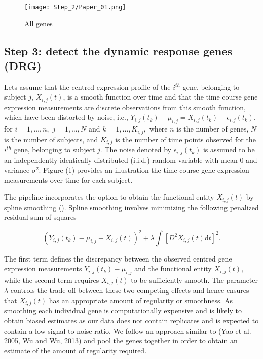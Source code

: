 
\begin{figure}
\centering
\texttt{[image: Step\_2/Paper\_01.png]}
\caption{All genes}
\label{fig:allgenes}
\end{figure}

\subsection*{Step 3: detect the dynamic response genes (DRG)}

Lets assume that the centred expression profile of the $i^{th}$ gene, belonging to subject $j$, $X_{i,j}(t)$, is a smooth function over time and that the time course gene expression measurements are discrete observations from this smooth function, which have been distorted by noise, i.e., $Y_{i,j}(t_{k}) -\mu_{i,j} =X_{i,j}(t_{k})+\epsilon_{i,j}(t_{k})$, for $i=1,\ldots,n,$ $j=1,\ldots,N$ and $k=1,\ldots,K_{i,j},$ where $n$ is the number of genes, $N$ is the number of subjects, and $K_{i,j}$ is the number of time points observed for the $i^{th}$ gene, belonging to subject $j$. The noise denoted by $\epsilon_{i,j}(t_{k})$ is assumed to be an independently identically distributed (i.i.d.) random variable with mean $0$ and variance $\sigma^{2}$. Figure (1) provides an illustration the time course gene expression measurements over time for each subject.

The pipeline incorporates the option to obtain the functional entity $X_{i,j}(t)$ by spline smoothing (\cite{green1993nonparametric,silverman2005functional}). Spline smoothing involves minimizing the following penalized residual sum of squares 

\begin{equation}
\label{eq:res_sum_squares}
(Y_{i,j}(t_{k}) -\mu_{i,j} - X_{i,j}(t))^{2} + \lambda \int \left[D^{2} X_{i,j}(t) \textrm{d}t\right]^{2}.
\end{equation}

The first term defines the discrepancy between the observed centred gene expression measurements $Y_{i,j}(t_{k}) -\mu_{i,j}$ and the functional entity $X_{i,j}(t),$ while the second term requires $X_{i,j}(t)$ to be sufficiently smooth. The parameter $\lambda$ controls the trade-off between these two competing effects and hence ensures that $X_{i,j}(t)$ has an appropriate amount of regularity or smoothness. As smoothing each individual gene is computationally expensive and is likely to obtain biased estimates as our data does not contain replicates and is expected to contain a low signal-to-noise ratio. We follow an approach similar to (Yao et al. 2005, Wu and Wu, 2013) and pool the genes together in order to obtain an estimate of the amount of regularity required.

